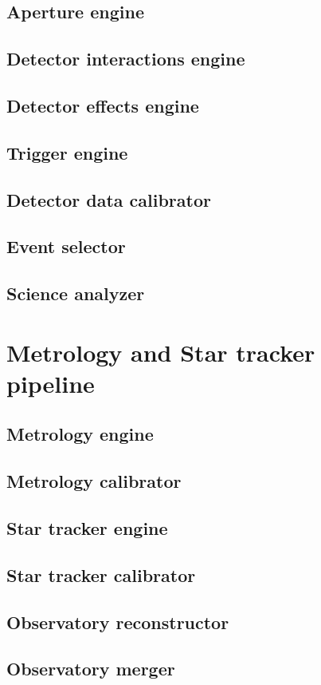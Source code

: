 \subsection{Aperture engine}
\subsection{Detector interactions engine}
\subsection{Detector effects engine}
\subsection{Trigger engine}
\subsection{Detector data calibrator}
\subsection{Event selector}
\subsection{Science analyzer}

\section{Metrology and Star tracker pipeline}
\subsection{Metrology engine}
\subsection{Metrology calibrator}
\subsection{Star tracker engine}
\subsection{Star tracker calibrator}
\subsection{Observatory reconstructor}
\subsection{Observatory merger}
